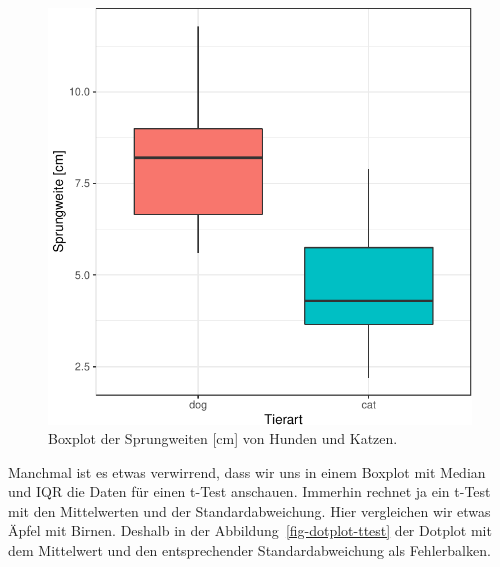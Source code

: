 \documentclass[
  letterpaper,
]{scrbook}
\begin{document}
\begin{figure}

{\centering \includegraphics{./stat-tests-ttest_files/figure-pdf/fig-boxplot-ttest-1.pdf}

}

\caption{\label{fig-boxplot-ttest}Boxplot der Sprungweiten {[}cm{]} von
Hunden und Katzen.}

\end{figure}

Manchmal ist es etwas verwirrend, dass wir uns in einem Boxplot mit
Median und IQR die Daten für einen t-Test anschauen. Immerhin rechnet ja
ein t-Test mit den Mittelwerten und der Standardabweichung. Hier
vergleichen wir etwas Äpfel mit Birnen. Deshalb in der
Abbildung~\ref{fig-dotplot-ttest} der Dotplot mit dem Mittelwert und den
entsprechender Standardabweichung als Fehlerbalken.
\end{document}
